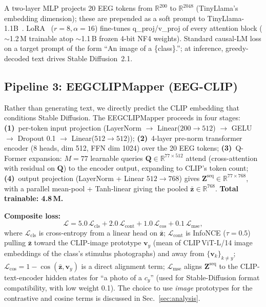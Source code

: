 \documentclass{article}
\begin{document}
A two-layer MLP projects 20 EEG tokens from $\mathbb{R}^{200}$ to $\mathbb{R}^{2048}$ (TinyLlama's embedding dimension); these are prepended as a soft prompt to TinyLlama-1.1B~\citep{zhang2024tinyllama}. LoRA~\citep{hu2022lora} ($r{=}8,\alpha{=}16$) fine-tunes q\_proj/v\_proj of every attention block ($\sim$1.2\,M trainable atop $\sim$1.1\,B frozen 4-bit NF4 weights). Standard causal-LM loss on a target prompt of the form ``An image of a \{class\}.''; at inference, greedy-decoded text drives Stable Diffusion~2.1.

\subsection{Pipeline 3: EEGCLIPMapper (EEG-CLIP)}
\label{sec:p3}

Rather than generating text, we directly predict the CLIP embedding that conditions Stable Diffusion. The EEGCLIPMapper proceeds in four stages: \textbf{(1)}~per-token input projection (LayerNorm $\to$ Linear($200{\to}512$) $\to$ GELU $\to$ Dropout 0.1 $\to$ Linear($512{\to}512$)); \textbf{(2)}~4-layer pre-norm transformer encoder (8 heads, dim 512, FFN dim 1024) over the 20 EEG tokens; \textbf{(3)}~Q-Former expansion: $M{=}77$ learnable queries $\mathbf{Q}\in\mathbb{R}^{77\times 512}$ attend (cross-attention with residual on $\mathbf{Q}$) to the encoder output, expanding to CLIP's token count; \textbf{(4)}~output projection (LayerNorm + Linear $512{\to}768$) gives $\mathbf{Z}^{\text{seq}}\in\mathbb{R}^{77\times 768}$, with a parallel mean-pool + Tanh-linear giving the pooled $\bar{\mathbf{z}}\in\mathbb{R}^{768}$. \textbf{Total trainable: 4.8\,M.}

\textbf{Composite loss:}
\begin{equation}
  \mathcal{L} = 5.0\,\mathcal{L}_\mathrm{cls} + 2.0\,\mathcal{L}_\mathrm{cont} + 1.0\,\mathcal{L}_\mathrm{cos} + 0.1\,\mathcal{L}_\mathrm{mse},
\end{equation}
where $\mathcal{L}_\mathrm{cls}$ is cross-entropy from a linear head on $\bar{\mathbf{z}}$; $\mathcal{L}_\mathrm{cont}$ is InfoNCE ($\tau{=}0.5$) pulling $\bar{\mathbf{z}}$ toward the CLIP-image prototype $\mathbf{v}_y$ (mean of CLIP\,ViT-L/14 image embeddings of the class's stimulus photographs) and away from $\{\mathbf{v}_k\}_{k\neq y}$; $\mathcal{L}_\mathrm{cos}{=}1{-}\cos(\bar{\mathbf{z}},\mathbf{v}_y)$ is a direct alignment term; $\mathcal{L}_\mathrm{mse}$ aligns $\mathbf{Z}^{\text{seq}}$ to the CLIP-text-encoder hidden states for ``a photo of a $c_y$'' (used for Stable-Diffusion format compatibility, with low weight 0.1). The choice to use \emph{image} prototypes for the contrastive and cosine terms is discussed in Sec.~\ref{sec:analysis}.
\end{document}
